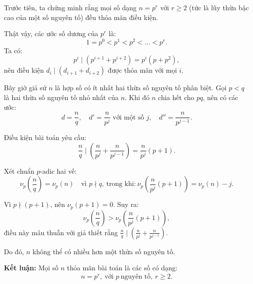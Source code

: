 \documentclass[../06-largest-exponent.tex]{subfiles}
\begin{document}
\begin{soln}
    Trước tiên, ta chứng minh rằng mọi số dạng \( n = p^r \) với \( r \ge 2 \) (tức là lũy thừa bậc cao của một số nguyên tố) đều thỏa mãn điều kiện.

    Thật vậy, các ước số dương của \( p^r \) là:
    \[
        1 = p^0 < p^1 < p^2 < \dots < p^r.
    \]
    Ta có:
    \[
        p^i \mid (p^{i+1} + p^{i+2}) = p^i(p + p^2),
    \]
    nên điều kiện \( d_i \mid (d_{i+1} + d_{i+2}) \) được thỏa mãn với mọi \( i \).

    Bây giờ giả sử \( n \) là hợp số có ít nhất hai thừa số nguyên tố phân biệt. Gọi \( p < q \) là hai thừa số nguyên tố nhỏ nhất của \( n \). Khi đó \( n \) chia hết cho \( pq \), nên có các ước:
    \[
        d = \frac{n}{q}, \quad d' = \frac{n}{p^j} \text{ với một số } j, \quad d'' = \frac{n}{p^{j-1}}.
    \]

    Điều kiện bài toán yêu cầu:
    \[
        \frac{n}{q} \mid \left( \frac{n}{p^j} + \frac{n}{p^{j-1}} \right) = \frac{n}{p^j}(p + 1).
    \]

    Xét chuẩn \( p \)-adic hai vế:
    \[
        \nu_p\left( \frac{n}{q} \right) = \nu_p(n) \quad \text{vì } p \nmid q,\ \text{trong khi:}\ \nu_p\left( \frac{n}{p^j}(p + 1) \right) = \nu_p(n) - j.
    \]
    
    Vì \( p \nmid (p + 1) \), nên \( \nu_p(p + 1) = 0 \).  
    Suy ra:
    \[
        \nu_p\left( \frac{n}{q} \right) > \nu_p\left( \frac{n}{p^j}(p + 1) \right),
    \]
    điều này mâu thuẫn với giả thiết rằng \( \frac{n}{q} \mid \left( \frac{n}{p^j} + \frac{n}{p^{j-1}} \right) \).  

    Do đó, \( n \) không thể có nhiều hơn một thừa số nguyên tố.  

    \textbf{Kết luận:} Mọi số \( n \) thỏa mãn bài toán là các số có dạng:
    \[
        \boxed{n = p^r,\ \text{với } p\ \text{nguyên tố},\ r \ge 2.}
    \]
\end{soln}

\end{document}
